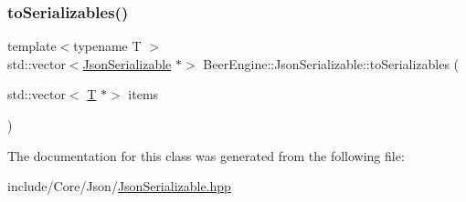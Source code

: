 \subsubsection{\texorpdfstring{to\+Serializables()}{toSerializables()}}
{\footnotesize\ttfamily template$<$typename T $>$ \\
std\+::vector$<$\mbox{\hyperlink{class_beer_engine_1_1_json_serializable}{Json\+Serializable}} $\ast$$>$ Beer\+Engine\+::\+Json\+Serializable\+::to\+Serializables (\begin{DoxyParamCaption}\item[{std\+::vector$<$ \mbox{\hyperlink{namespace_beer_engine_a94f0b552f6dc910de8cdb44207981f53a8de48e594408f9fc561b2f68ce05f664}{T}} $\ast$$>$}]{items }\end{DoxyParamCaption})\hspace{0.3cm}{\ttfamily [inline]}}



The documentation for this class was generated from the following file\+:\begin{DoxyCompactItemize}
\item 
include/\+Core/\+Json/\mbox{\hyperlink{_json_serializable_8hpp}{Json\+Serializable.\+hpp}}\end{DoxyCompactItemize}
